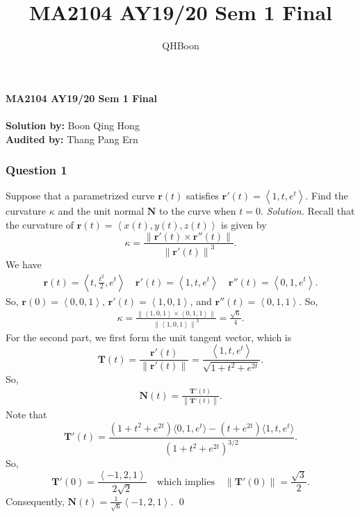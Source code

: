 \documentclass[12pt, twoside=false]{scrbook}
\title{MA2104 AY19/20 Sem 1 Final}
\author{QHBoon}
\date{}
\newcommand{\vc}[1]{\textbf{{#1}}}
\newcommand{\pvc}[1]{\left\langle {#1} \right\rangle}
\newcounter{a}
\begin{document}
\thispagestyle{empty}

\begin{center}
    \textsf{\textbf{\huge MA2104 AY19/20 Sem 1 Final}}\\
    \ \\
    \textsf{\textbf{\large Solution by:} \large Boon Qing Hong} \\
    \textsf{\textbf{\large Audited by:} \large Thang Pang Ern}
\end{center}

\subsubsection*{Question 1} Suppose that a parametrized curve $\vc{r}(t)$ satisfies $\vc{r}'(t)=\pvc{1, t, e^t}$. Find the curvature $\kappa$ and the unit normal $\vc{N}$ to the curve when $t=0$.
\newline
\newline\textit{Solution.} Recall that the curvature of $\mathbf{r}\left(t\right)=\pvc{x(t), y(t), z(t)}$ is given by \[\kappa=\frac{\left\|\mathbf{r}'\left(t\right)\times \mathbf{r}''\left(t\right)\right\|}{\left\|\mathbf{r}'\left(t\right)\right\|^3}.\]
We have \begin{align*}
    \mathbf{r}\left(t\right)=\left\langle t,\frac{t^2}{2},e^t\right\rangle \quad \mathbf{r}'\left(t\right)=\left\langle 1,t,e^t\right\rangle \quad \mathbf{r}''\left(t\right)=\left\langle 0,1,e^t\right\rangle.
\end{align*}
So, $\mathbf{r}\left(0\right)=\left\langle 0,0,1\right\rangle$, $\mathbf{r}'\left(t\right)=\left\langle 1,0,1\right\rangle$, and $\mathbf{r}''\left(t\right)=\left\langle 0,1,1\right\rangle$. So, \begin{align*}
    \kappa=\frac{\left\|\left\langle 1,0,1\right\rangle \times \left\langle 0,1,1\right\rangle \right\|}{\left\|\left\langle 1,0,1\right\rangle\right\|^3}=\frac{\sqrt{6}}{4}.
\end{align*}
For the second part, we first form the unit tangent vector, which is \[\mathbf{T}\left(t\right)=\frac{\mathbf{r}'\left(t\right)}{\left\|\mathbf{r}'\left(t\right)\right\|}=\frac{\left\langle 1,t,e^t\right\rangle}{\sqrt{1+t^2+e^{2t}}}.\]
So, \begin{align*}
    \mathbf{N}\left(t\right)=\frac{\mathbf{T}'\left(t\right)}{\left\|\mathbf{T}'\left(t\right)\right\|}.
\end{align*}
Note that \[\mathbf{T}'\left(t\right)=\frac{(1+t^2+e^{2t})\langle0,1,e^t\rangle-(t+e^{2t})\langle1,t,e^t\rangle}
{(1+t^2+e^{2t})^{3/2}}.\]
So, \[\mathbf{T}'\left(0\right)=\frac{\left\langle -1,2,1\right\rangle }{2\sqrt{2}}\quad\text{which implies}\quad \left\|\mathbf{T}'\left(0\right)\right\|=\frac{\sqrt{3}}{2}.\]
Consequently, $\mathbf{N}\left(t\right)=\frac{1}{\sqrt{6}}\left\langle -1,2,1\right\rangle$.
\qed 
\end{document}
